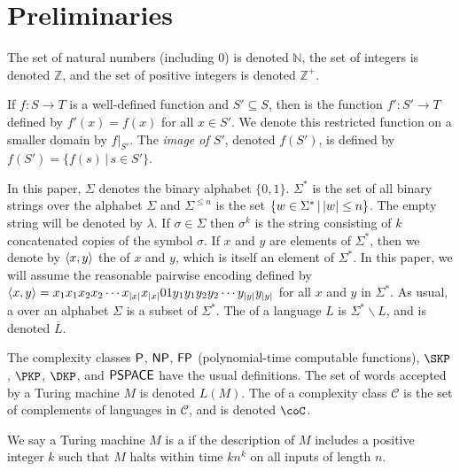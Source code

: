 \section{Preliminaries}
\label{sec:preliminaries}

The set of natural numbers (including $0$) is denoted $\mathbb{N}$, the set of integers is denoted $\mathbb{Z}$, and the set of positive integers is denoted $\mathbb{Z}^+$.

If $f\colon S\to T$ is a well-defined function and $S'\subseteq S$, then  is the function $f'\colon S'\to T$ defined by $f'(x)=f(x)$ for all $x\in S'$.
We denote this restricted function on a smaller domain by $f|_{S'}$.
The \emph{image of $S'$}, denoted $f(S')$, is defined by $f(S') = \{f(s) \, | \, s \in S'\}$.

In this paper, $\Sigma$ denotes the binary alphabet $\{0, 1\}$.
$\Sigma^*$ is the set of all binary strings over the alphabet $\Sigma$ and $\Sigma^{\leq n}$ is the set $\lb w\in\Sigma^* \st |w|\leq n \rb$.
The empty string will be denoted by $\lambda$.
If $\sigma\in\Sigma$ then $\sigma^k$ is the string consisting of $k$ concatenated copies of the symbol $\sigma$.
If $x$ and $y$ are elements of $\Sigma^*$, then we denote by $\pair{x}{y}$ the  of $x$ and $y$, which is itself an element of $\Sigma^*$.
In this paper, we will assume the reasonable pairwise encoding defined by $\pair{x}{y}=x_1x_1x_2x_2\cdots x_{|x|}x_{|x|}01y_1y_1y_2y_2\cdots y_{|y|}y_{|y|}$ for all $x$ and $y$ in $\Sigma^*$.
As usual, a  over an alphabet $\Sigma$ is a subset of $\Sigma^*$.
The  of a language $L$ is $\Sigma^*\backslash L$, and is denoted $\overline{L}$.

The complexity classes $\P$, $\NP$, $\FP$ (polynomial-time computable functions), $\SKP$, $\PKP$, $\DKP$, and $\PSPACE$ have the usual definitions.
The set of words accepted by a Turing machine $M$ is denoted $L(M)$.
The  of a complexity class $\mathcal{C}$ is the set of complements of languages in $\mathcal{C}$, and is denoted $\coC$.

We say a Turing machine $M$ is a  if the description of $M$ includes a positive integer $k$ such that $M$ halts within time $kn^k$ on all inputs of length $n$.

